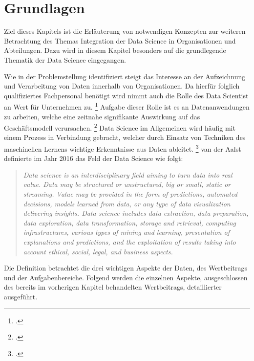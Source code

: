 \chapter[Grundlagen]{Grundlagen}

Ziel dieses Kapitels ist die Erläuterung von notwendigen Konzepten zur weiteren Betrachtung des Themas Integration der Data Science in Organisationen und Abteilungen.
Dazu wird in diesem Kapitel besonders auf die grundlegende Thematik der Data Science eingegangen.

Wie in der Problemstellung identifiziert steigt das Interesse an der Aufzeichnung und Verarbeitung von Daten innerhalb von Organisationen. 
Da hierfür folglich qualifiziertes Fachpersonal benötigt wird nimmt auch die Rolle des Data Scientist an Wert für Unternehmen zu. \footcite[prenote][postnote]{the role of data scientists}
Aufgabe dieser Rolle ist es an Datenanwendungen zu arbeiten, welche eine zeitnahe signifikante Auswirkung auf das Geschäftsmodell verursachen. \footcite[prenote][postnote]{aim of data scientists}
Data Science im Allgemeinen wird häufig mit einem Prozess in Verbindung gebracht, welcher durch Einsatz von Techniken des maschinellen Lernens wichtige Erkenntnisse aus Daten ableitet. \footcite[prenote][postnote]{data science often refers}
van der Aalst definierte im Jahr 2016 das Feld der Data Science wie folgt: \cite[prenote][postnote]{data science definition}

\begin{quotation}
    \textit{
    Data science is an interdisciplinary ﬁeld aiming to turn data into real value.
    Data may be structured or unstructured, big or small, static or streaming.
    Value may be provided in the form of predictions, automated decisions, models learned from data, or any type of data visualization delivering insights.
    Data science includes data extraction, data preparation, data exploration, data transformation, storage and retrieval, computing infrastructures, various types of mining and learning, presentation of explanations and predictions, and the exploitation of results taking into account ethical, social, legal, and business aspects.    
    }
\end{quotation}

Die Definition betrachtet die drei wichtigen Aspekte der Daten, des Wertbeitrags und der Aufgabenbereiche.
Folgend werden die einzelnen Aspekte, ausgeschlossen des bereits im vorherigen Kapitel behandelten Wertbeitrags, detaillierter ausgeführt.

